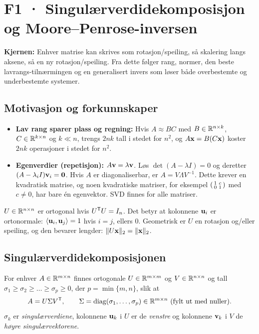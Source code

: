 \section{F1 · Singulærverdidekomposisjon og Moore--Penrose-inversen}

\textbf{Kjernen:} Enhver matrise kan skrives som rotasjon/speiling, så skalering langs aksene, så en ny rotasjon/speiling. Fra dette følger rang, normer, den beste lavrangs-tilnærmingen og en generalisert invers som løser både overbestemte og underbestemte systemer.

\subsection{Motivasjon og forkunnskaper}
\begin{itemize}
  \item \textbf{Lav rang sparer plass og regning:} Hvis $A\approx BC$ med $B\in\mathbb{R}^{n\times k}$, $C\in\mathbb{R}^{k\times n}$ og $k\ll n$, trengs $2nk$ tall i stedet for $n^2$, og $A\mathbf{x}=B(C\mathbf{x})$ koster $2nk$ operasjoner i stedet for $n^2$.
  \item \textbf{Egenverdier (repetisjon):} $A\mathbf{v}=\lambda\mathbf{v}$. Løs $\det(A-\lambda I)=0$ og deretter $(A-\lambda_i I)\mathbf{v}_i=\mathbf{0}$. Hvis $A$ er diagonaliserbar, er $A=V\Lambda V^{-1}$. Dette krever en kvadratisk matrise, og noen kvadratiske matriser, for eksempel $\begin{psmallmatrix}1&c\\0&1\end{psmallmatrix}$ med $c\neq 0$, har bare én egenvektor. SVD finnes for alle matriser.
\end{itemize}

\begin{defn}
$U\in\mathbb{R}^{n\times n}$ er ortogonal hvis $U^{\mathsf{T}} U=I_n$. Det betyr at kolonnene $\mathbf{u}_i$ er ortonormale: $\langle \mathbf{u}_i,\mathbf{u}_j\rangle=1$ hvis $i=j$, ellers $0$. Geometrisk er $U$ en rotasjon og/eller speiling, og den bevarer lengder: $\lVert U\mathbf{x}\rVert_2=\lVert \mathbf{x}\rVert_2$.
\end{defn}

\subsection{Singulærverdidekomposisjonen}
\begin{teorem}[SVD]
For enhver $A\in\mathbb{R}^{m\times n}$ finnes ortogonale $U\in\mathbb{R}^{m\times m}$ og $V\in\mathbb{R}^{n\times n}$ og tall $\sigma_1\ge\sigma_2\ge\dots\ge\sigma_p\ge 0$, der $p=\min\{m,n\}$, slik at
\[
A=U\Sigma V^{\mathsf{T}},\qquad \Sigma=\operatorname{diag}(\sigma_1,\dots,\sigma_p)\in\mathbb{R}^{m\times n}\ \text{(fylt ut med nuller)}.
\]
$\sigma_k$ er \emph{singulærverdiene}, kolonnene $\mathbf{u}_k$ i $U$ er de \emph{venstre} og kolonnene $\mathbf{v}_k$ i $V$ de \emph{høyre singulærvektorene}.
\end{teorem}

